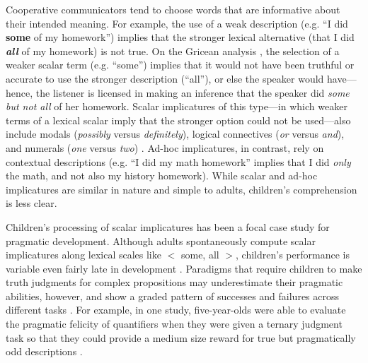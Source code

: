 \documentclass[10pt,letterpaper]{article}
\begin{document}
Cooperative communicators tend to choose words that are informative about their intended meaning. For example, the use of a weak description (e.g. ``I did \textbf{some} of my homework'') implies that the stronger lexical alternative (that I did \emph{\textbf{all}} of my homework) is not true. On the Gricean analysis \citep{grice1975}, the selection of a weaker scalar term (e.g. ``some'') implies that it would not have been truthful or accurate to use the stronger description (``all''), or else the speaker would have---hence, the listener is licensed in making an inference that the speaker did \emph{some but not all} of her homework. 
Scalar implicatures of this type---in which weaker terms of a lexical scalar imply that the stronger option could not be used---also include modals (\emph{possibly} versus \emph{definitely}), logical connectives (\emph{or} versus \emph{and}), and numerals (\emph{one} versus \emph{two}) \citep{horn1972}. Ad-hoc implicatures, in contrast, rely on contextual descriptions (e.g. ``I did my math homework'' implies that I did \emph{only} the math, and not also my history homework).  While scalar and ad-hoc implicatures are similar in nature and simple to adults, children's comprehension is less clear.

Children's processing of scalar implicatures has been a focal case study for pragmatic development. Although adults spontaneously compute scalar implicatures along lexical scales like $<$ {\sc some, all} $>$, children's performance is variable even fairly late in development \citep{noveck2001}.  Paradigms that require children to make truth judgments for complex propositions may underestimate their pragmatic abilities, however, and show a graded pattern of successes and failures across different tasks \citep{guasti2005,papafragou2003, papafragou2004}. For example, in one study, five-year-olds were able to evaluate the pragmatic felicity of quantifiers when they were given a ternary judgment task so that they could provide a medium size reward for true but pragmatically odd descriptions \citep{katsos2011}.  
\end{document}
